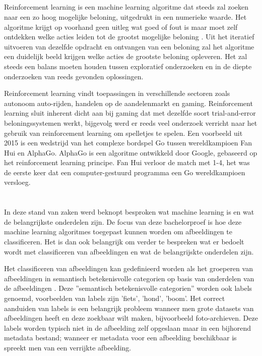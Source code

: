 \subsection{}
\label{sec:reinforcement-learning}
Reinforcement learning is een machine learning algoritme dat steeds zal zoeken naar een zo hoog mogelijke beloning, uitgedrukt in een numerieke waarde. Het algoritme krijgt op voorhand geen uitleg wat goed of fout is maar moet zelf ontdekken welke acties leiden tot de grootst mogelijke beloning \autocite{Sutton2018}. Uit het iteratief uitvoeren van dezelfde opdracht en ontvangen van een beloning zal het algoritme een duidelijk beeld krijgen welke acties de grootste beloning opleveren. Het zal steeds een balans moeten houden tussen exploratief onderzoeken en in de diepte onderzoeken van reeds gevonden oplossingen. 

Reinforcement learning vindt toepassingen in verschillende sectoren zoals autonoom auto-rijden, handelen op de aandelenmarkt en gaming. Reinforcement learning sluit inherent dicht aan bij gaming dat met dezelfde soort trial-and-error beloningssystemen werkt, bijgevolg werd er reeds veel onderzoek verricht naar het gebruik van reinforcement learning om spelletjes te spelen. Een voorbeeld uit 2015 is een wedstrijd van het complexe bordspel Go tussen wereldkampioen Fan Hui en AlphaGo. AlphaGo is een algoritme ontwikkeld door Google, gebaseerd op het reinforcement learning principe. Fan Hui verloor de match met 1-4, het was de eerste keer dat een computer-gestuurd programma een Go wereldkampioen versloeg.

\section{}
\label{sec:classificeren-van-afbeeldingen}
In deze stand van zaken werd beknopt besproken wat machine learning is en wat de belangrijkste onderdelen zijn. De focus van deze bachelorproef is hoe deze machine learning algoritmes toegepast kunnen worden om afbeeldingen te classificeren. Het is dan ook belangrijk om verder te bespreken wat er bedoelt wordt met classificeren van afbeeldingen en wat de belangrijskte onderdelen zijn.

Het classificeren van afbeeldingen kan gedefinieerd worden als het groeperen van afbeeldingen in semantisch betekenisvolle categorien op basis van onderdelen van de afbeeldingen \autocite{Vailaya1998}. Deze ''semantisch betekenisvolle categorien'' worden ook labels genoemd, voorbeelden van labels zijn 'fiets', 'hond', 'boom'. Het correct aanduiden van labels is een belangrijk probleem wanneer men grote datasets van afbeeldingen heeft en deze zoekbaar wilt maken, bijvoorbeeld foto-archieven. Deze labels worden typisch niet in de afbeelding zelf opgeslaan maar in een bijhorend metadata bestand; wanneer er metadata voor een afbeelding beschikbaar is spreekt men van een verrijkte afbeelding.

